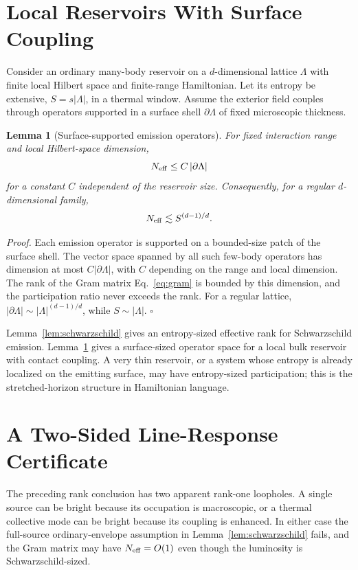 \documentclass[12pt]{article}
\newtheorem{lemma}{Lemma}
\newcommand{\be}{\begin{equation}}
\newcommand{\ee}{\end{equation}}
\newcommand{\Neff}{N_{\rm eff}}
\begin{document}
\section{Local Reservoirs With Surface Coupling}

Consider an ordinary many-body reservoir on a $d$-dimensional lattice
$\Lambda$ with finite local Hilbert space and finite-range Hamiltonian.
Let its entropy be extensive, $S=s|\Lambda|$, in a thermal window.
Assume the exterior field couples through operators supported in a
surface shell $\partial\Lambda$ of fixed microscopic thickness.

\begin{lemma}[Surface-supported emission operators]
\label{lem:surface}
For fixed interaction range and local Hilbert-space dimension,
\be
  \Neff \le C\,|\partial\Lambda|
\ee
for a constant $C$ independent of the reservoir size.  Consequently,
for a regular $d$-dimensional family,
\be
  \Neff \lesssim S^{(d-1)/d}.
\ee
\end{lemma}

\emph{Proof.}
Each emission operator is supported on a bounded-size patch of the
surface shell.  The vector space spanned by all such few-body operators
has dimension at most $C|\partial\Lambda|$, with $C$ depending on the
range and local dimension.  The rank of the Gram matrix
Eq.~\eqref{eq:gram} is bounded by this dimension, and the participation
ratio never exceeds the rank.  For a regular lattice,
$|\partial\Lambda|\sim |\Lambda|^{(d-1)/d}$, while
$S\sim |\Lambda|$.
\hfill$\square$

Lemma~\ref{lem:schwarzschild} gives an entropy-sized effective rank for
Schwarzschild emission.  Lemma~\ref{lem:surface} gives a surface-sized
operator space for a local bulk reservoir with contact coupling.  A very
thin reservoir, or a system whose entropy is already localized on the
emitting surface, may have entropy-sized participation; this is the
stretched-horizon structure in Hamiltonian language.

\section{A Two-Sided Line-Response Certificate}
\label{sec:static-certificate}

The preceding rank conclusion has two apparent rank-one loopholes.  A
single source can be bright because its occupation is macroscopic, or a
thermal collective mode can be bright because its coupling is enhanced.
In either case the full-source ordinary-envelope assumption in
Lemma~\ref{lem:schwarzschild} fails, and the Gram matrix may have
$\Neff=O(1)$ even though the luminosity is Schwarzschild-sized.
\end{document}
